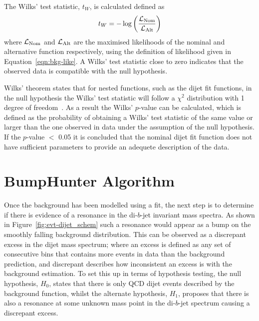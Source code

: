\noindent
The Wilks' test statistic, $t_W$, is calculated defined as
\begin{equation}
  t_{W} = -\log{\left(\frac{\ensuremath{\mathcal{L}}_{\text{Nom}}}{\ensuremath{\mathcal{L}}_{\text{Alt}}}\right)}  \label{eqn:bkg-wilks}
\end{equation}
where $\mathcal{L}_{\text{Nom}}$ and $\mathcal{L}_{\text{Alt}}$ are the maximised likelihoods of the nominal and alternative function respectively,
using the definition of likelihood given in Equation~\ref{eqn:bkg-like}.
A Wilks' test statistic close to zero indicates that the observed data is compatible with the null hypothesis.

Wilks' theorem states that for nested functions, such as the dijet fit functions,
in the null hypothesis the Wilks' test statistic will follow a $\chi^2$ distribution with 1 degree of freedom~\cite{dibjet-wilks}.
As a result the Wilks' $p$-value can be calculated, which is defined as the probability of obtaining a
Wilks' test statistic of the same value or larger than the one observed in data under the assumption of the null hypothesis.
If the \mbox{$p$-value} $<$ 0.05 it is concluded that the nominal dijet fit function does not have sufficient
parameters to provide an adequete description of the data.


\section{BumpHunter Algorithm}
\label{sec:bkg-bh}

Once the background has been modelled using a fit, the next step is to determine
if there is evidence of a resonance in the di-$b$-jet invariant mass spectra.
As shown in Figure~\ref{fig:evt-dijet_schem} such a resonance would appear as a bump on the smoothly falling background distribution.
This can be observed as a discrepant excess in the dijet mass spectrum;
where an excess is defined as any set of consecutive bins that contains
more events in data than the background prediction,
and discrepant describes how inconsistent an excess is with the background estimation.
To set this up in terms of hypothesis testing, the null hypothesis, $H_0$,
states that there is only QCD dijet events described by the background function,
whilst the alternate hypothesis, $H_1$, proposes that there is also a resonance at some
unknown mass point in the di-$b$-jet spectrum causing a discrepant excess.


